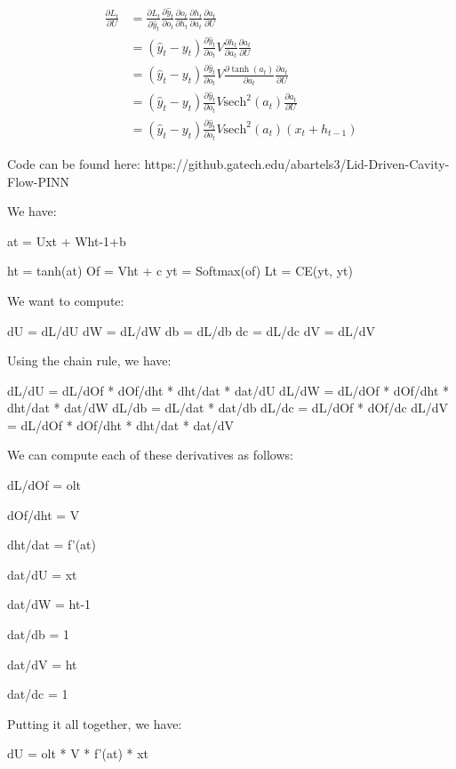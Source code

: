 \documentclass{article}
\begin{document}
	\begin{equation}
	\begin{aligned}
	\frac{\partial L_t}{\partial U} &= \frac{\partial L_t}{\partial \hat{y}_t} \frac{\partial \hat{y}_t}{\partial o_t} \frac{\partial o_t}{\partial h_t} \frac{\partial h_t}{\partial a_t} \frac{\partial a_t}{\partial U} \\
	&= (\hat{y}_t- y_t) \frac{\partial \hat{y}_t}{\partial o_t} V \frac{\partial h_t}{\partial a_t} \frac{\partial a_t}{\partial U} \\
	&= (\hat{y}_t - y_t) \frac{\partial \hat{y}_t}{\partial o_t} V \frac{\partial \tanh(a_t)}{\partial a_t} \frac{\partial a_t}{\partial U} \\
	&= (\hat{y}_t - y_t) \frac{\partial \hat{y}_t}{\partial o_t} V \text{sech}^2(a_t) \frac{\partial a_t}{\partial U} \\
	&= (\hat{y}_t - y_t) \frac{\partial \hat{y}_t}{\partial o_t} V \text{sech}^2(a_t) (x_t + h_{t-1})
	\end{aligned}
	\end{equation}

	Code can be found here: https://github.gatech.edu/abartels3/Lid-Driven-Cavity-Flow-PINN
	
	We have:
	
	at = Uxt + Wht-1+b
	
	ht = tanh(at)
	Of = Vht + c
	yt = Softmax(of)
	Lt = CE(yt, yt)
	
	We want to compute:
	
	dU = dL/dU
	dW = dL/dW
	db = dL/db
	dc = dL/dc
	dV = dL/dV
	
	Using the chain rule, we have:
	
	dL/dU = dL/dOf * dOf/dht * dht/dat * dat/dU
	dL/dW = dL/dOf * dOf/dht * dht/dat * dat/dW
	dL/db = dL/dat * dat/db
	dL/dc = dL/dOf * dOf/dc
	dL/dV = dL/dOf * dOf/dht * dht/dat * dat/dV
	
	We can compute each of these derivatives as follows:
	
	dL/dOf = olt
	
	dOf/dht = V
	
	dht/dat = f'(at)
	
	dat/dU = xt
	
	dat/dW = ht-1
	
	dat/db = 1
	
	dat/dV = ht
	
	dat/dc = 1
	
	Putting it all together, we have:
	
	dU = olt * V * f'(at) * xt
	
\end{document}
